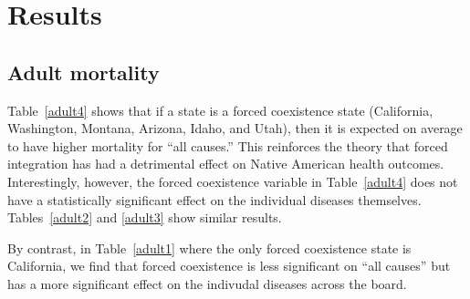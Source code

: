 \documentclass[12pt]{article}
\begin{document}


\section{Results}

\subsection{Adult mortality}
Table~\ref{adult4} shows that if a state is a forced coexistence state (California, Washington, Montana, Arizona, Idaho, and Utah), then it is expected on average to have higher mortality for ``all causes.'' This reinforces the theory that forced integration has had a detrimental effect on Native American health outcomes. 
Interestingly, however, the forced coexistence variable in Table~\ref{adult4} does not have a statistically significant effect on the individual diseases themselves. 
Tables~\ref{adult2} and \ref{adult3} show similar results.

By contrast, in Table~\ref{adult1} where the only forced coexistence state is California, we find that forced coexistence is less significant on ``all causes'' but has a more significant effect on the indivudal diseases across the board.
\end{document}
